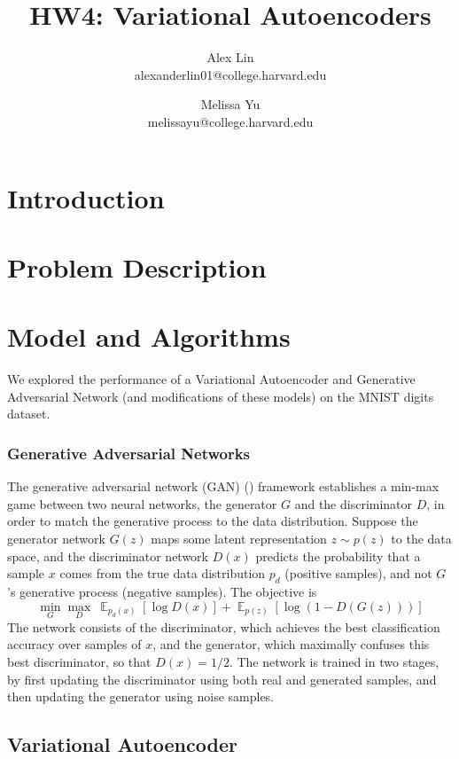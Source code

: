 \documentclass[11pt]{article}
\title{HW4: Variational Autoencoders}
\author{Alex Lin \\ alexanderlin01@college.harvard.edu \and Melissa Yu \\ melissayu@college.harvard.edu}
\DeclareMathOperator{\E}{\mathbb{E}} %
\begin{document}
\maketitle{}
\section{Introduction}

\section{Problem Description}

\section{Model and Algorithms}

We explored the performance of a Variational Autoencoder and Generative Adversarial Network (and modifications of these models) on the MNIST digits dataset.

\subsubsection{Generative Adversarial Networks} \label{sssec:gan}
The generative adversarial network (GAN) (\cite{gan}) framework establishes a min-max game between two neural networks, the generator $G$ and the discriminator $D$, in order to match the generative process to the data distribution. Suppose the generator network $G(z)$ maps some latent representation $z\sim p(z)$ to the data space, and the discriminator network $D(x)$ predicts the probability that a sample $x$ comes from the true data distribution $p_d$ (positive samples), and not $G$'s generative process (negative samples). The objective is
\begin{equation}
\min_G \max_D \ \E_{p_d(x)} [\log D(x)] + \E_{p(z)} [\log (1 - D(G(z)))]
\end{equation}
The network consists of the discriminator, which achieves the best classification accuracy over samples of $x$, and the generator, which maximally confuses this best discriminator, so that $D(x) = 1/2$. The network is trained in two stages, by first updating the discriminator using both real and generated samples, and then updating the generator using noise samples.

\subsection{Variational Autoencoder}
\cite{vae}
\end{document}
